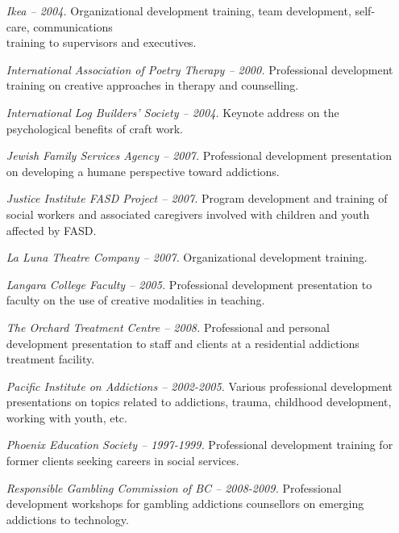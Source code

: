 \documentclass[10pt,DIV09,letterpaper,oneside,headsepline]{scrreprt}
\begin{document}
\begin{itemize}
\item [\textit{Ikea -- 2004.}]
Organizational development training, team development, self-care, communications\\ training to supervisors and executives.

\item [\textit{International Association of Poetry Therapy -- 2000.}]
Professional development training on creative approaches in therapy and counselling.

\item [\textit{International Log Builders' Society -- 2004.}]
Keynote address on the psychological benefits of craft work.

\item [\textit{Jewish Family Services Agency -- 2007.}]
Professional development presentation on developing a humane perspective toward addictions.

\item [\textit{Justice Institute FASD Project -- 2007.}]
Program development and training of social workers and associated caregivers involved with children and youth affected by FASD.

\item [\textit{La Luna Theatre Company -- 2007.}]
Organizational development training.

\item [\textit{Langara College Faculty -- 2005.}]
Professional development presentation to faculty on the use of creative modalities in teaching.

\item [\textit{The Orchard Treatment Centre -- 2008.}]
Professional and personal development presentation to staff and clients at a residential addictions treatment facility.

\item [\textit{Pacific Institute on Addictions -- 2002-2005.}]
Various professional development presentations on topics related to addictions, trauma, childhood development, working with youth, etc.

\item [\textit{Phoenix Education Society -- 1997-1999.}]
Professional development training for former clients seeking careers in social services.

\item [\textit{Responsible Gambling Commission of BC -- 2008-2009.}]
Professional development workshops for gambling addictions counsellors on emerging addictions to technology.


\end{itemize}
\end{document}
